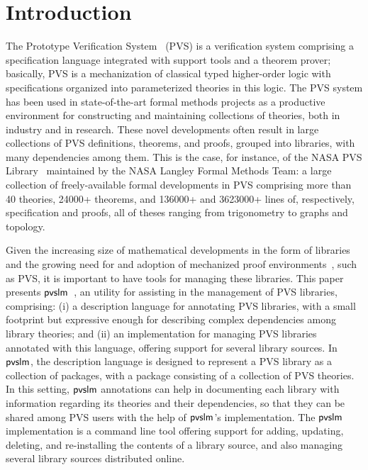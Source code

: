 \section{Introduction}
\label{sec.intro}


The Prototype Verification System~\cite{pvs-cade92} (PVS) is a
verification system comprising a specification language integrated
with support tools and a theorem prover; basically, PVS is a
mechanization of classical typed higher-order logic with
specifications organized into parameterized theories in this logic.
The PVS system has been used in state-of-the-art formal methods
projects as a productive environment for constructing and maintaining
collections of theories, both in industry and in research. These novel
developments often result in large collections of PVS definitions,
theorems, and proofs, grouped into libraries, with many dependencies
among them. This is the case, for instance, of the NASA PVS
Library~\cite{nasalib} maintained by the NASA Langley Formal Methods
Team: a large collection of freely-available formal developments in
PVS comprising more than 40 theories, 24000+ theorems, and 136000+ and
3623000+ lines of, respectively, specification and proofs, all of
theses ranging from trigonometry to graphs and topology.

Given the increasing size of mathematical developments in the form of
libraries and the growing need for and adoption of mechanized proof
environments~\cite{avigad-mech14,hales-proofs14}, such as PVS, it is
important to have tools for managing these libraries. This paper
presents $\textsf{pvslm}$~\cite{pvslm}, an utility for assisting in the
management of PVS libraries, comprising: (i) a description language
for annotating PVS libraries, with a small footprint but expressive
enough for describing complex dependencies among library theories; and
(ii) an implementation for managing PVS libraries annotated with this
language, offering support for several library sources. In $\textsf{pvslm}$,
the description language is designed to represent a PVS library as a
collection of packages, with a package consisting of a collection of
PVS theories. In this setting, $\textsf{pvslm}$ annotations can help in
documenting each library with information regarding its theories and
their dependencies, so that they can be shared among PVS users with
the help of $\textsf{pvslm}$'s implementation. The $\textsf{pvslm}$ implementation is
a command line tool offering support for adding, updating, deleting,
and re-installing the contents of a library source, and also managing
several library sources distributed online.

